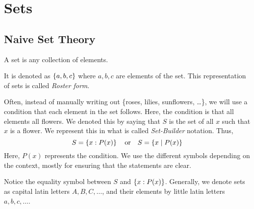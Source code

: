 \chapter{Sets}



\section{Naive Set Theory}




\begin{definition}
    A set is any collection of elements.

    It is denoted as \(\left\{a,b,c\right\}\) where \(a,b, c\) are elements of the set.
    This representation of sets is called \emph{Roster form}.
\end{definition}


Often, instead of manually writing out \{roses, lilies, sunflowers, \dots\}, we will
use a condition that each element in the set follows. Here, the condition is that all
elements all flowers. We denoted this by saying that \(S\) is the set of all \(x\) such that 
\(x\) is a flower. We represent this in what is called \emph{Set-Builder} notation. Thus,
\[S = \left\{x : P(x)\right\} \quad \text{or} \quad S = \{x \mid P(x)\}\] 
Here, \( P(x)\) represents the condition. We use the different symbols depending on the context,
mostly for ensuring that the statements are clear.

\begin{remark}
    Notice the equality symbol between \(S\) and \(\left\{x : P(x)\right\}\). Generally, we denote sets
    as capital latin letters \(A, B, C, \dots\), and their elements by little latin
    letters \(a, b, c, \dots\).
\end{remark}

